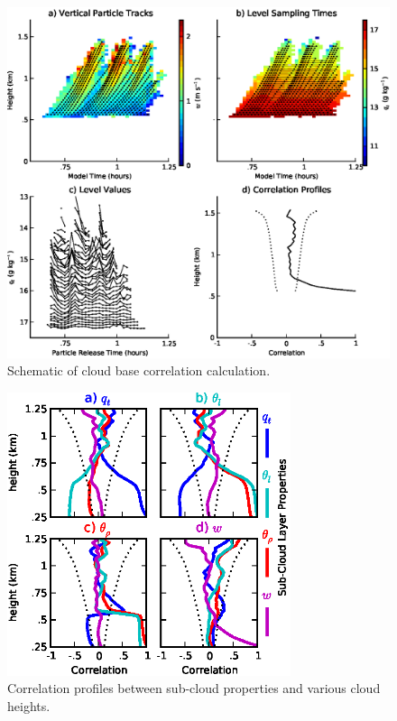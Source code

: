 \documentclass[acp]{copernicus}
\begin{document}
\begin{figure}[t]
\vspace*{2mm}
\begin{center}
\includegraphics[width=\textwidth]{./figures/cloud_base_schematic}
\end{center}
\caption{Schematic of cloud base correlation calculation.}
\label{fig:cloud_base_schematic}
\end{figure}

\begin{figure}[t]
\vspace*{2mm}
\begin{center}
\includegraphics[width=8.3cm]{./figures/sub_cloud_profiles}
\end{center}
\caption{Correlation profiles between sub-cloud properties and various cloud heights.}
\label{fig:sub_cloud_profiles}
\end{figure}
\end{document}
